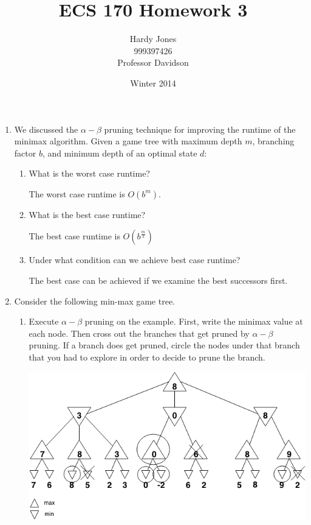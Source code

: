 \documentclass[12pt,letterpaper]{article}
\title{ECS 170 Homework 3\vspace{-2ex}}
\author{Hardy Jones\\
        999397426\\
        Professor Davidson\vspace{-2ex}}
\date{Winter 2014}
\begin{document}
  \maketitle

  \begin{enumerate}
    \item
      We discussed the $\alpha-\beta$ pruning technique for improving the runtime of the minimax algorithm.
      Given a game tree with maximum depth $m$, branching factor $b$, and minimum depth of an optimal state $d$:

      \begin{enumerate}
        \item What is the worst case runtime?

          The worst case runtime is $O(b^m)$.
        \item What is the best case runtime?

          The best case runtime is $O(b^\frac{m}{2})$
        \item Under what condition can we achieve best case runtime?

          The best case can be achieved if we examine the best successors first.
      \end{enumerate}
    \item
      Consider the following min-max game tree.

      \begin{enumerate}
        \item
          Execute $\alpha-\beta$ pruning on the example.
          First, write the minimax value at each node.
          Then cross out the branches that get pruned by $\alpha-\beta$ pruning.
          If a branch does get pruned, circle the nodes under that branch that you had to explore in order to decide to prune the branch.

          \includegraphics[width=5.5in]{minimax_circled.png}


\end{enumerate}
\end{enumerate}
\end{document}
